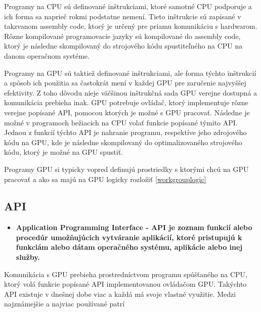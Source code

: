Programy na CPU sú definované inštrukciami, ktoré samotné CPU podporuje a ich forma sa naprieč rokmi podstatne nemení. Tieto inštrukcie sú zapísané v takzvanom assembly code, ktorý je určený pre priamu komunikáciu s hardwarom. Rôzne kompilované programovacie jazyky sú kompilované do assembly code, ktorý je následne skompilovaný do strojového kódu spustiteľného na CPU na danom operačnom systéme.

Programy na GPU sú taktiež definované inštrukciami, ale forma týchto inštrukcií a spôsob ich použitia sa častokrát mení v každej GPU pre zaručenie najvyššej efektivity. Z toho dôvodu nieje väčšinou inštrukčná sada GPU verejne dostupná a komunikácia prebieha inak. GPU potrebuje ovládač, ktorý implementuje rôzne verejne popísané API, pomocou ktorých je možné s GPU pracovať. Následne je možné v programoch bežiacich na CPU volať funkcie popísané týmito API. Jednou z funkcií týchto API je nahranie programu, respektíve jeho zdrojového kódu na GPU, kde je následne skompilovaný do optimalizovaného strojového kódu, ktorý je možné na GPU spustiť. 

Programy GPU si typicky vopred definujú prostriedky s ktorými chcú na GPU pracovať a ako sa majú na GPU logicky rozložiť \ref{workgrouplogic}

\subsection{API}

\begin{itemize}
  \item{\bf Application Programming Interface - API \rm je zoznam funkcií alebo procedúr umožňujúcich vytváranie aplikácií, ktoré pristupujú k funkciám alebo dátam operačného systému, aplikácie alebo inej služby.}
\end{itemize}

Komunikácia s GPU prebieha prostredníctvom programu spúšťaného na CPU, ktorý volá funkcie popísané API implementovanou ovládačom GPU. Takýchto API existuje v dnešnej dobe viac a každá má svoje vlastné využitie. Medzi najznámejšie a najviac používané patrí

